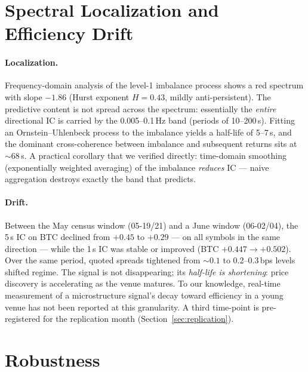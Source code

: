 \documentclass[11pt,a4paper]{article}
\theoremstyle{definition}
\theoremstyle{plain}
\begin{document}
\section{Spectral Localization and Efficiency Drift}
\label{sec:spectral}

\paragraph{Localization.} Frequency-domain analysis of the level-1
imbalance process shows a red spectrum with slope $-1.86$
(Hurst exponent $H = 0.43$, mildly anti-persistent). The predictive
content is not spread across the spectrum: essentially the
\emph{entire} directional IC is carried by the 0.005--0.1\,Hz band
(periods of 10--200\,s). Fitting an Ornstein--Uhlenbeck process to the
imbalance yields a half-life of 5--7\,s, and the dominant
cross-coherence between imbalance and subsequent returns sits at
${\sim}68$\,s. A practical corollary that we verified directly:
time-domain smoothing (exponentially weighted averaging) of the
imbalance \emph{reduces} IC --- naive aggregation destroys exactly the
band that predicts.

\paragraph{Drift.} Between the May census window (05-19/21) and a
June window (06-02/04), the 5\,s IC on BTC declined from $+0.45$ to
$+0.29$ --- on all symbols in the same direction --- while the 1\,s IC
was stable or improved (BTC $+0.447 \to +0.502$). Over the same
period, quoted spreads tightened from ${\sim}0.1$ to 0.2--0.3\,bps
levels shifted regime. The signal is not disappearing; its
\emph{half-life is shortening}: price discovery is accelerating as the
venue matures. To our knowledge, real-time measurement of a
microstructure signal's decay toward efficiency in a young venue has
not been reported at this granularity. A third time-point is
pre-registered for the replication month
(Section~\ref{sec:replication}).

\section{Robustness}\label{sec:robustness}
\end{document}
